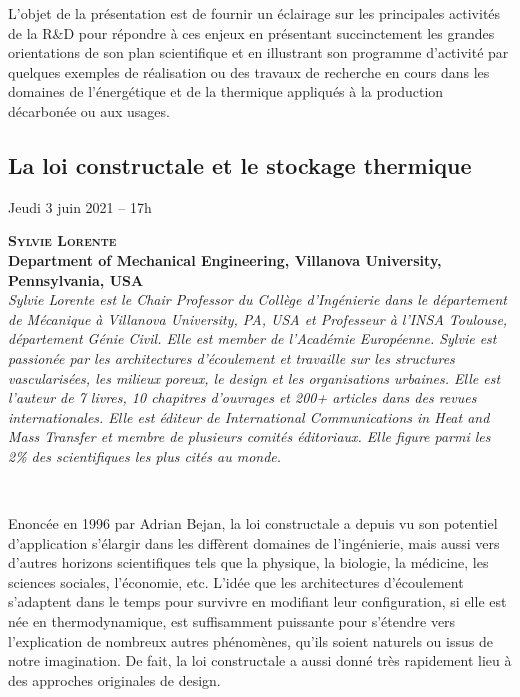 L'objet de la présentation est de fournir un éclairage sur les principales activités de la R\&D pour répondre à ces enjeux en présentant succinctement les grandes orientations de son plan scientifique et en illustrant son programme d'activité par quelques exemples de réalisation ou des travaux de recherche en cours dans les domaines de l'énergétique et de la thermique appliqués à la production décarbonée ou aux usages.


\clearpage
{}\subsection*{La loi constructale et le stockage thermique}
%
\begin{center}
Jeudi 3 juin 2021 -- 17h
\end{center}

\hspace{0.04\linewidth}\vrule\hspace{0.01\linewidth}\parbox{0.88\linewidth}{
\textbf{{\scshape Sylvie Lorente }\\ Department of Mechanical Engineering, Villanova University, Pennsylvania, USA}
\\
{\slshape Sylvie Lorente est le Chair Professor du Collège d’Ingénierie dans le département de Mécanique à Villanova University, PA, USA et Professeur à l’INSA Toulouse, département Génie Civil. Elle est member de l’Académie Européenne. Sylvie est passionée par les architectures d’écoulement et travaille sur les structures vascularisées, les milieux poreux, le design et les organisations urbaines. Elle est l’auteur de 7 livres, 10 chapitres d’ouvrages et 200+ articles dans des revues internationales. Elle est éditeur de International Communications in Heat and Mass Transfer et membre de plusieurs comités éditoriaux. Elle figure parmi les 2\% des scientifiques les plus cités au monde. }
}\\[2ex]

\vspace{1cm}

Enoncée en 1996 par Adrian Bejan, la loi constructale a depuis vu son potentiel d’application s’élargir dans les diffèrent domaines de l’ingénierie, mais aussi vers d’autres horizons scientifiques tels que la physique, la biologie, la médicine, les sciences sociales, l’économie, etc. L’idée que les architectures d’écoulement s’adaptent dans le temps pour survivre en modifiant leur configuration, si elle est née en thermodynamique, est suffisamment puissante pour s’étendre vers l’explication de nombreux autres phénomènes, qu’ils soient naturels ou issus de notre imagination. De fait, la loi constructale a aussi donné très rapidement lieu à des approches originales de design.

